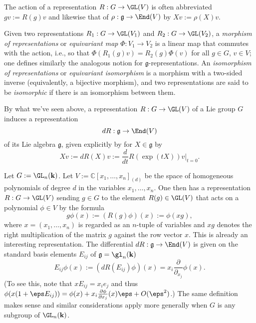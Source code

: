 \documentclass[reqno]{amsart} 
\begin{document}
\begin{definition}
  The action of a representation
  $R : G \rightarrow \GL(V)$
  is often abbreviated $g v := R(g) v$
  and likewise
  that of
  $\rho  : \mathfrak{g}  \rightarrow \End(V)$
  by $X v := \rho(X) v$.

  Given two representations
  $R_1 : G \rightarrow \GL(V_1)$
  and
  $R_2 : G \rightarrow \GL(V_2)$,
  a \emph{morphism of representations}
  or \emph{equivariant map}
  $\Phi : V_1 \rightarrow V_2$
  is a linear map that commutes
  with the action,
  i.e., so that
  $\Phi(R_1(g) v) = R_2(g) \Phi(v)$
  for all $g \in G$, $v \in V$;
  one defines similarly the analogous notion for
  $\mathfrak{g}$-representations.
  An \emph{isomorphism of representations}
  or \emph{equivariant isomorphism}
  is a morphism with a two-sided inverse
  (equivalently, a bijective morphism),
  and two representations are said to be \emph{isomorphic}
  if there is an isomorphism between them.
\end{definition}
By what we've seen above,
a representation $R : G \rightarrow \GL(V)$ of a Lie group $G$
induces a representation
\begin{equation*}
d R : \mathfrak{g} \rightarrow \End(V)
\end{equation*}
of its Lie algebra
$\mathfrak{g}$,
given explicitly by for $X \in \mathfrak{g}$ by
\begin{equation*}
X v := d R(X) v :=\frac{d}{ d t} R(\exp(t X)) v |_{t=0}.
\end{equation*}
\begin{example}\label{ex:polynomial-reps-linear-groups}
  Let $G := \GL_n(\mathbf{k})$.
  Let $V := \mathbb{C}[x_1,\dotsc,x_n]_{(d)}$ be the space of homogeneous polynomials
  of degree $d$ in the variables $x_1,\dotsc,x_n$.
  One then has a representation
  $R : G \rightarrow \GL(V)$
  sending $g \in G$
  to the element $R(g) \in \GL(V)$
  that acts on a polynomial $\phi \in V$
  by the formula
  \begin{equation*}
    g \phi(x) :=
    (R(g) \phi)(x) :=
    \phi(x g),
  \end{equation*}
  where $x = (x_1,\dotsc,x_n)$ is regarded as an $n$-tuple of
  variables
  and $x g$ denotes the right multiplication of the matrix $g$
  against
  the row vector $x$.
  This is already an interesting representation.
  The differential
  $d R : \mathfrak{g} \rightarrow \End(V)$
  is given on the standard basis elements $E_{i j}$ of $\mathfrak{g} = \gl_n(\mathbf{k})$
  \begin{equation*}
  E_{i j} \phi(x) := (d R(E_{i j}) \phi )(x)
  = x_i \frac{\partial }{\partial_{x_j}} \phi(x).
  \end{equation*}
  (To see this,
  note that
  $x E_{i j} = x_i e_j$
  and thus $\phi(x(1 + \eps E_{i j}))
  = \phi(x) + x_i \frac{\partial \phi}{\partial x_j}(x) \eps + O(\eps^2)$.)
  The same definition makes sense and similar
  considerations apply more generally when $G$ is any subgroup of
  $\GL_n(\mathbf{k})$.
\end{example}
\end{document}
